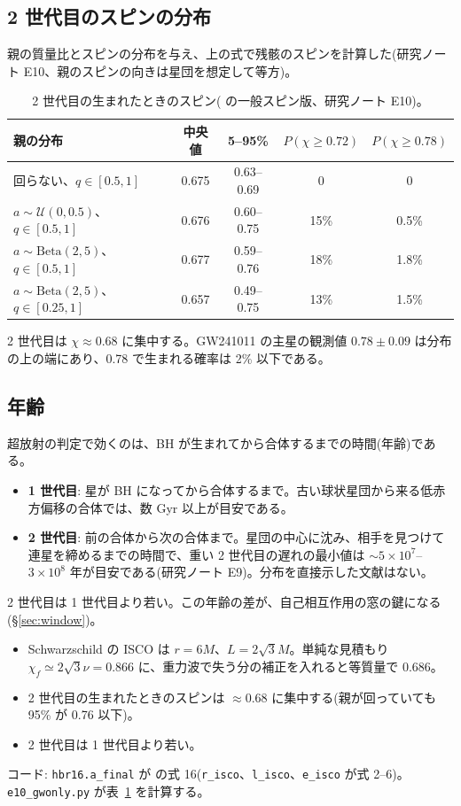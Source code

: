 \subsection{2 世代目のスピンの分布}

親の質量比とスピンの分布を与え、上の式で残骸のスピンを計算した(研究ノート E10、親のスピンの向きは星団を想定して等方)。

\begin{table}[H]
\centering\small
\caption{2 世代目の生まれたときのスピン( の一般スピン版、研究ノート E10)。}
\label{tab:natal}
\begin{tabular}{@{}lcccc@{}}
\toprule
親の分布 & 中央値 & 5--95\% & $P(\chi\ge0.72)$ & $P(\chi\ge0.78)$ \\
\midrule
回らない、$q\in[0.5,1]$ & 0.675 & 0.63--0.69 & 0 & 0 \\
$a\sim\mathcal U(0,0.5)$、$q\in[0.5,1]$ & 0.676 & 0.60--0.75 & 15\% & 0.5\% \\
$a\sim\mathrm{Beta}(2,5)$、$q\in[0.5,1]$ & 0.677 & 0.59--0.76 & 18\% & 1.8\% \\
$a\sim\mathrm{Beta}(2,5)$、$q\in[0.25,1]$ & 0.657 & 0.49--0.75 & 13\% & 1.5\% \\
\bottomrule
\end{tabular}
\end{table}
2 世代目は $\chi\approx0.68$ に集中する。GW241011 の主星の観測値 $0.78\pm0.09$ は分布の上の端にあり、0.78 で生まれる確率は 2\% 以下である。

\subsection{年齢}

超放射の判定で効くのは、BH が生まれてから合体するまでの時間(年齢)である。
\begin{itemize}
\item \textbf{1 世代目}: 星が BH になってから合体するまで。古い球状星団から来る低赤方偏移の合体では、数 Gyr 以上が目安である。
\item \textbf{2 世代目}: 前の合体から次の合体まで。星団の中心に沈み、相手を見つけて連星を締めるまでの時間で、重い 2 世代目の遅れの最小値は $\sim5\times10^7$--$3\times10^8$ 年が目安である(研究ノート E9)。分布を直接示した文献はない。
\end{itemize}
2 世代目は 1 世代目より若い。この年齢の差が、自己相互作用の窓の鍵になる(\S\ref{sec:window})。

\begin{summary}
\begin{itemize}
\item Schwarzschild の ISCO は $r=6M$、$L=2\sqrt3M$。単純な見積もり $\chi_f\simeq2\sqrt3\nu=0.866$ に、重力波で失う分の補正を入れると等質量で 0.686。
\item 2 世代目の生まれたときのスピンは $\approx0.68$ に集中する(親が回っていても 95\% が 0.76 以下)。
\item 2 世代目は 1 世代目より若い。
\end{itemize}
\end{summary}

\begin{tocode}
コード: \texttt{hbr16.a\_final} が  の式 16(\texttt{r\_isco}、\texttt{l\_isco}、\texttt{e\_isco} が式 2--6)。\texttt{e10\_gwonly.py} が表~\ref{tab:natal} を計算する。
\end{tocode}
